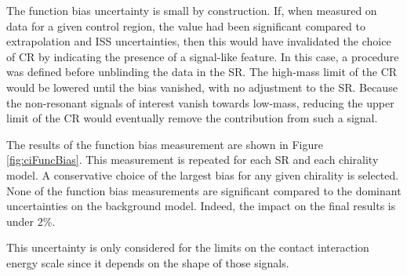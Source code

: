 The function bias uncertainty is small by construction.
If, when measured on data for a given control region, the value had been significant compared to extrapolation and ISS uncertainties, then this would have invalidated the choice of CR by indicating the presence of a signal-like feature.
In this case, a procedure was defined before unblinding the data in the SR.
The high-mass limit of the CR would be lowered until the bias vanished, with no adjustment to the SR. 
Because the non-resonant signals of interest vanish towards low-mass, reducing the upper limit of the CR would eventually remove the contribution from such a signal.

The results of the function bias measurement are shown in Figure \ref{fig:ciFuncBias}.
This measurement is repeated for each SR and each chirality model.
A conservative choice of the largest bias for any given chirality is selected.
None of the function bias measurements are significant compared to the dominant uncertainties on the background model.
Indeed, the impact on the final results is under 2\%.

This uncertainty is only considered for the limits on the contact interaction energy scale \lam since it depends on the shape of those signals.

